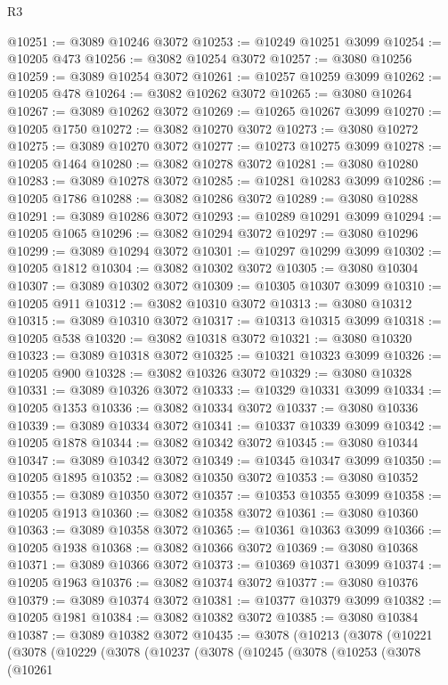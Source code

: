 \begin{lexlean}{R3}
\begin{coremodule}
@10251 := @3089 @10246 @3072
@10253 := @10249 @10251 @3099
@10254 := @10205 @473
@10256 := @3082 @10254 @3072
@10257 := @3080 @10256
@10259 := @3089 @10254 @3072
@10261 := @10257 @10259 @3099
@10262 := @10205 @478
@10264 := @3082 @10262 @3072
@10265 := @3080 @10264
@10267 := @3089 @10262 @3072
@10269 := @10265 @10267 @3099
@10270 := @10205 @1750
@10272 := @3082 @10270 @3072
@10273 := @3080 @10272
@10275 := @3089 @10270 @3072
@10277 := @10273 @10275 @3099
@10278 := @10205 @1464
@10280 := @3082 @10278 @3072
@10281 := @3080 @10280
@10283 := @3089 @10278 @3072
@10285 := @10281 @10283 @3099
@10286 := @10205 @1786
@10288 := @3082 @10286 @3072
@10289 := @3080 @10288
@10291 := @3089 @10286 @3072
@10293 := @10289 @10291 @3099
@10294 := @10205 @1065
@10296 := @3082 @10294 @3072
@10297 := @3080 @10296
@10299 := @3089 @10294 @3072
@10301 := @10297 @10299 @3099
@10302 := @10205 @1812
@10304 := @3082 @10302 @3072
@10305 := @3080 @10304
@10307 := @3089 @10302 @3072
@10309 := @10305 @10307 @3099
@10310 := @10205 @911
@10312 := @3082 @10310 @3072
@10313 := @3080 @10312
@10315 := @3089 @10310 @3072
@10317 := @10313 @10315 @3099
@10318 := @10205 @538
@10320 := @3082 @10318 @3072
@10321 := @3080 @10320
@10323 := @3089 @10318 @3072
@10325 := @10321 @10323 @3099
@10326 := @10205 @900
@10328 := @3082 @10326 @3072
@10329 := @3080 @10328
@10331 := @3089 @10326 @3072
@10333 := @10329 @10331 @3099
@10334 := @10205 @1353
@10336 := @3082 @10334 @3072
@10337 := @3080 @10336
@10339 := @3089 @10334 @3072
@10341 := @10337 @10339 @3099
@10342 := @10205 @1878
@10344 := @3082 @10342 @3072
@10345 := @3080 @10344
@10347 := @3089 @10342 @3072
@10349 := @10345 @10347 @3099
@10350 := @10205 @1895
@10352 := @3082 @10350 @3072
@10353 := @3080 @10352
@10355 := @3089 @10350 @3072
@10357 := @10353 @10355 @3099
@10358 := @10205 @1913
@10360 := @3082 @10358 @3072
@10361 := @3080 @10360
@10363 := @3089 @10358 @3072
@10365 := @10361 @10363 @3099
@10366 := @10205 @1938
@10368 := @3082 @10366 @3072
@10369 := @3080 @10368
@10371 := @3089 @10366 @3072
@10373 := @10369 @10371 @3099
@10374 := @10205 @1963
@10376 := @3082 @10374 @3072
@10377 := @3080 @10376
@10379 := @3089 @10374 @3072
@10381 := @10377 @10379 @3099
@10382 := @10205 @1981
@10384 := @3082 @10382 @3072
@10385 := @3080 @10384
@10387 := @3089 @10382 @3072
@10435 := @3078
    (@10213
      (@3078
        (@10221
          (@3078
            (@10229
              (@3078
                (@10237
                  (@3078
                    (@10245
                      (@3078
                        (@10253
                          (@3078
                            (@10261

\end{coremodule}
\end{lexlean}
